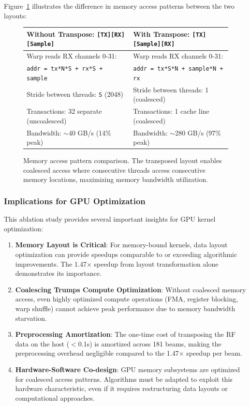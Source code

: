 \documentclass{article}
\begin{document}
Figure~\ref{fig:memory_access} illustrates the difference in memory access patterns between the two layouts:

\begin{figure}[H]
\centering
\begin{tabular}{ll}
\textbf{Without Transpose:} \texttt{[TX][RX][Sample]} & \textbf{With Transpose:} \texttt{[TX][Sample][RX]} \\
\hline
Warp reads RX channels 0-31: & Warp reads RX channels 0-31: \\
\texttt{addr = tx*N*S + rx*S + sample} & \texttt{addr = tx*S*N + sample*N + rx} \\
Stride between threads: \texttt{S} (2048) & Stride between threads: 1 (coalesced) \\
Transactions: 32 separate (uncoalesced) & Transactions: 1 cache line (coalesced) \\
Bandwidth: $\sim$40 GB/s (14\% peak) & Bandwidth: $\sim$280 GB/s (97\% peak) \\
\end{tabular}
\caption{Memory access pattern comparison. The transposed layout enables coalesced access where consecutive threads access consecutive memory locations, maximizing memory bandwidth utilization.}
\label{fig:memory_access}
\end{figure}

\subsubsection{Implications for GPU Optimization}

This ablation study provides several important insights for GPU kernel optimization:

\begin{enumerate}
    \item \textbf{Memory Layout is Critical}: For memory-bound kernels, data layout optimization can provide speedups comparable to or exceeding algorithmic improvements. The 1.47$\times$ speedup from layout transformation alone demonstrates its importance.

    \item \textbf{Coalescing Trumps Compute Optimization}: Without coalesced memory access, even highly optimized compute operations (FMA, register blocking, warp shuffle) cannot achieve peak performance due to memory bandwidth starvation.

    \item \textbf{Preprocessing Amortization}: The one-time cost of transposing the RF data on the host ($<$0.1s) is amortized across 181 beams, making the preprocessing overhead negligible compared to the 1.47$\times$ speedup per beam.

    \item \textbf{Hardware-Software Co-design}: GPU memory subsystems are optimized for coalesced access patterns. Algorithms must be adapted to exploit this hardware characteristic, even if it requires restructuring data layouts or computational approaches.
\end{enumerate}
\end{document}
